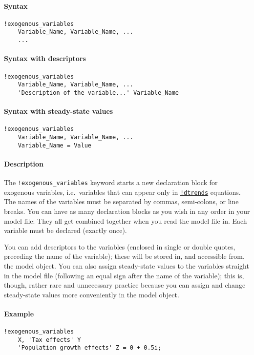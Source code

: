 


	\paragraph{Syntax}\label{syntax}

\begin{verbatim}
!exogenous_variables
    Variable_Name, Variable_Name, ...
    ...
\end{verbatim}

\paragraph{Syntax with descriptors}\label{syntax-with-descriptors}

\begin{verbatim}
!exogenous_variables
    Variable_Name, Variable_Name, ...
    'Description of the variable...' Variable_Name
\end{verbatim}

\paragraph{Syntax with steady-state
values}\label{syntax-with-steady-state-values}

\begin{verbatim}
!exogenous_variables
    Variable_Name, Variable_Name, ...
    Variable_Name = Value
\end{verbatim}

\paragraph{Description}\label{description}

The \texttt{!exogenous\_variables} keyword starts a new declaration
block for exogenous variables, i.e.~variables that can appear only in
\href{modellang/dtrends}{\texttt{!dtrends}} equations. The names of the
variables must be separated by commas, semi-colons, or line breaks. You
can have as many declaration blocks as you wish in any order in your
model file: They all get combined together when you read the model file
in. Each variable must be declared (exactly once).

You can add descriptors to the variables (enclosed in single or double
quotes, preceding the name of the variable); these will be stored in,
and accessible from, the model object. You can also assign steady-state
values to the variables straight in the model file (following an equal
sign after the name of the variable); this is, though, rather rare and
unnecessary practice because you can assign and change steady-state
values more conveniently in the model object.

\paragraph{Example}\label{example}

\begin{verbatim}
!exogenous_variables
    X, 'Tax effects' Y
    'Population growth effects' Z = 0 + 0.5i;
\end{verbatim}


